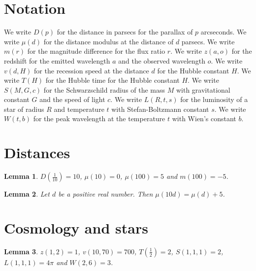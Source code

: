 \documentclass{article}
\newtheorem{lemma}{Lemma}
\begin{document}
\section{Notation}

We write $D(p)$ for the distance in parsecs for the parallax of $p$ arcseconds.
We write $\mu(d)$ for the distance modulus at the distance of $d$ parsecs.
We write $m(r)$ for the magnitude difference for the flux ratio $r$.
We write $z(a,o)$ for the redshift for the emitted wavelength $a$ and the observed wavelength $o$.
We write $v(d,H)$ for the recession speed at the distance $d$ for the Hubble constant $H$.
We write $T(H)$ for the Hubble time for the Hubble constant $H$.
We write $S(M,G,c)$ for the Schwarzschild radius of the mass $M$ with gravitational constant $G$ and the speed of light $c$.
We write $L(R,t,s)$ for the luminosity of a star of radius $R$ and temperature $t$ with Stefan-Boltzmann constant $s$.
We write $W(t,b)$ for the peak wavelength at the temperature $t$ with Wien's constant $b$.

\section{Distances}

\begin{lemma}\label{distances}
$D(\frac{1}{10})=10$, $\mu(10)=0$, $\mu(100)=5$ and $m(100)=-5$.
\end{lemma}

\begin{lemma}\label{modulus}
Let $d$ be a positive real number. Then $\mu(10d)=\mu(d)+5$.
\end{lemma}

\section{Cosmology and stars}

\begin{lemma}\label{values}
$z(1,2)=1$, $v(10,70)=700$, $T(\frac{1}{2})=2$, $S(1,1,1)=2$, $L(1,1,1)=4\pi$ and $W(2,6)=3$.
\end{lemma}
\end{document}
